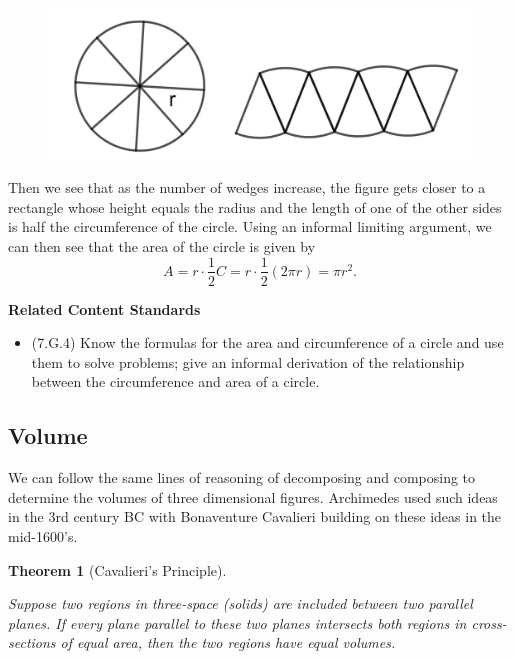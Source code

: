 \documentclass[
]{book}
\providecommand{\tightlist}{%
  \setlength{\itemsep}{0pt}\setlength{\parskip}{0pt}}
\newenvironment{standards}{}{}
\newtheorem{theorem}{Theorem}[chapter]
\theoremstyle{definition}
\theoremstyle{definition}
\theoremstyle{definition}
\theoremstyle{definition}
\theoremstyle{remark}
\begin{document}
\begin{figure}

{\centering \includegraphics[width=0.6\linewidth]{images/Area_circle} 

}

\end{figure}

Then we see that as the number of wedges increase, the figure gets closer to a rectangle whose height equals the radius and the length of one of the other sides is half the circumference of the circle. Using an informal limiting argument, we can then see that the area of the circle is given by
\[A = r \cdot \frac{1}{2} C = r \cdot \frac{1}{2} (2\pi r) = \pi r^2.\]

\begin{standards}

\begin{center}
\textbf{Related Content Standards}

\end{center}

\begin{itemize}
\tightlist
\item
  (7.G.4) Know the formulas for the area and circumference of a circle and use them to solve problems; give an informal derivation of the relationship between the circumference and area of a circle.
\end{itemize}

\end{standards}

\hypertarget{volume}{%
\subsection{Volume}\label{volume}}

We can follow the same lines of reasoning of decomposing and composing to determine the volumes of three dimensional figures. Archimedes used such ideas in the 3rd century BC with Bonaventure Cavalieri building on these ideas in the mid-1600's.

\begin{theorem}[Cavalieri's Principle]
\protect\hypertarget{thm:unlabeled-div-204}{}\label{thm:unlabeled-div-204}

Suppose two regions in three-space (solids) are included between two parallel planes. If every plane parallel to these two planes intersects both regions in cross-sections of equal area, then the two regions have equal volumes.

\end{theorem}
\end{document}
